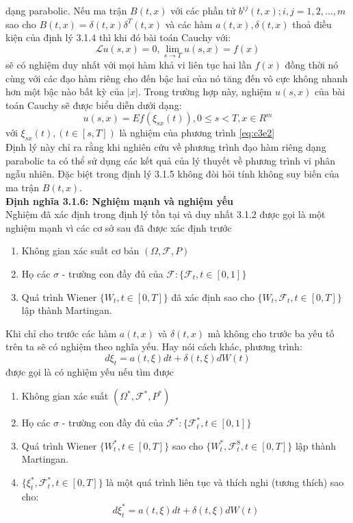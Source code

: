 \documentclass[14pt,a4paper]{article}
\numberwithin{equation}{section}
\begin{document}
dạng parabolic. Nếu ma trận $B(t,x)$ với các phần tử $b^{ij}(t,x);i,j=1,2,...,m$ sao cho $B(t,x)=\delta(t,x)\delta^T(t,x)$ và các hàm $a(t,x),\delta(t,x)$ thoả điều kiện của định lý 3.1.4 thì khi đó bài toán Cauchy với:
\begin{equation*}
	\mathscr{L}u(s,x)=0,\lim\limits_{s\rightarrow T}u(s,x)=f(x)
\end{equation*} 
sẽ có nghiệm duy nhất với mọi hàm khả vi liên tục hai lần $f(x)$ đồng thời nó cùng với các đạo hàm riêng cho đến bậc hai của nó tăng đến vô cực không nhanh hơn một bậc nào bất kỳ của $|x|$. Trong trường hợp này, nghiệm $u(s,x)$ của bài toán Cauchy sẽ được biểu diễn dưới dạng:
\begin{equation*}
	u(s,x)=Ef(\xi_{sx}(t)),0\leq s<T,x\in R^m
\end{equation*}
với $\xi_{sx}(t),(t\in[s,T])$ là nghiệm của phương trình \eqref{eq:c3e2}\\
Định lý này chỉ ra rằng khi nghiên cứu về phương trình đạo hàm riêng dạng parabolic ta có thể sử dụng các kết quả của lý thuyết về phương trình vi phân ngẫu nhiên. Đặc biệt trong định lý 3.1.5 không đòi hỏi tính không suy biến của ma trận $B(t,x)$.\\
\textbf{Định nghĩa 3.1.6: Nghiệm mạnh và nghiệm yếu}\\
Nghiệm đã xác định trong định lý tồn tại và duy nhất 3.1.2 được gọi là một nghiệm mạnh vì các cơ sở sau đã được xác định trước
\begin{enumerate}[1)]
	\item Không gian xác suất cơ bản $(\Omega,\mathscr{F},P)$
	\item Họ các $\sigma$ - trường con đầy đủ của $\mathscr{F}:\{\mathscr{F}_t,t\in[0,1]\}$
	\item Quá trình Wiener $\{W_t,t\in[0,T]\}$ đã xác định sao cho $\{W_t,\mathscr{F}_t,t\in[0,T]\}$ lập thành Martingan.
\end{enumerate}
Khi chỉ cho trước các hàm $a(t,x)$ và $\delta(t,x)$ mà không cho trước ba yếu tố trên ta sẽ có nghiệm theo nghĩa yếu. Hay nói cách khác, phương trình:
\begin{equation*}
	d\xi_t=a(t,\xi)dt+\delta(t,\xi)dW(t)
\end{equation*}
được gọi là có nghiệm yếu nếu tìm được
\begin{enumerate}[(1*)]
	\item Không gian xác suất $(\Omega^*,\mathscr{F}^*,P^*)$
	\item Họ các $\sigma$ - trường con đầy đủ của $\mathscr{F}^*:\{\mathscr{F}^*_t,t\in[0,1]\}$
	\item Quá trình Wiener $\{W_t^*,t\in[0,T]\}$ sao cho $\{W_t^*,\mathscr{F}^8_t,t\in[0,T]\}$ lập thành Martingan.
	\item $\{\xi_t^*,\mathscr{F}_t^*,t\in[0,T]\}$ là một quá trình liên tục và thích nghi (tương thích) sao cho:
	\begin{equation*}
		d\xi_t^*=a(t,\xi)dt+\delta(t,\xi)dW(t)	
	\end{equation*}
\end{enumerate}
\end{document}
